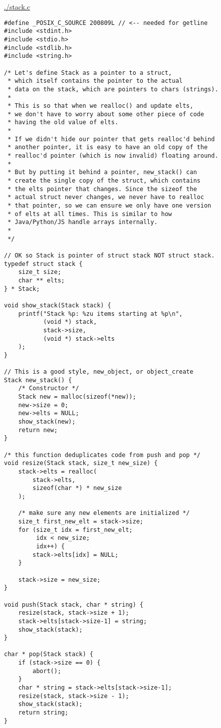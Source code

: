 \documentclass[11pt]{article}
\begin{document}
\url{./stack.c}
\begin{verbatim}
#define _POSIX_C_SOURCE 200809L // <-- needed for getline
#include <stdint.h>
#include <stdio.h>
#include <stdlib.h>
#include <string.h>

/* Let's define Stack as a pointer to a struct,
 * which itself contains the pointer to the actual
 * data on the stack, which are pointers to chars (strings).
 * 
 * This is so that when we realloc() and update elts,
 * we don't have to worry about some other piece of code
 * having the old value of elts.
 * 
 * If we didn't hide our pointer that gets realloc'd behind
 * another pointer, it is easy to have an old copy of the
 * realloc'd pointer (which is now invalid) floating around.
 * 
 * But by putting it behind a pointer, new_stack() can
 * create the single copy of the struct, which contains
 * the elts pointer that changes. Since the sizeof the
 * actual struct never changes, we never have to realloc
 * that pointer, so we can ensure we only have one version
 * of elts at all times. This is similar to how
 * Java/Python/JS handle arrays internally.
 * 
 */

// OK so Stack is pointer of struct stack NOT struct stack.
typedef struct stack {
    size_t size;
    char ** elts;
} * Stack;

void show_stack(Stack stack) {
    printf("Stack %p: %zu items starting at %p\n",
           (void *) stack,
           stack->size,
           (void *) stack->elts
    );
}

// This is a good style, new_object, or object_create
Stack new_stack() {
    /* Constructor */
    Stack new = malloc(sizeof(*new));
    new->size = 0;
    new->elts = NULL;
    show_stack(new);
    return new;
}

/* this function deduplicates code from push and pop */
void resize(Stack stack, size_t new_size) {
    stack->elts = realloc(
        stack->elts,
        sizeof(char *) * new_size
    );
    
    /* make sure any new elements are initialized */
    size_t first_new_elt = stack->size;
    for (size_t idx = first_new_elt;
         idx < new_size;
         idx++) {
        stack->elts[idx] = NULL;
    }
    
    stack->size = new_size;
}

void push(Stack stack, char * string) {
    resize(stack, stack->size + 1);
    stack->elts[stack->size-1] = string;
    show_stack(stack);
}

char * pop(Stack stack) {
    if (stack->size == 0) {
        abort();
    }
    char * string = stack->elts[stack->size-1];
    resize(stack, stack->size - 1);
    show_stack(stack);
    return string;
}


\end{verbatim}
\end{document}
